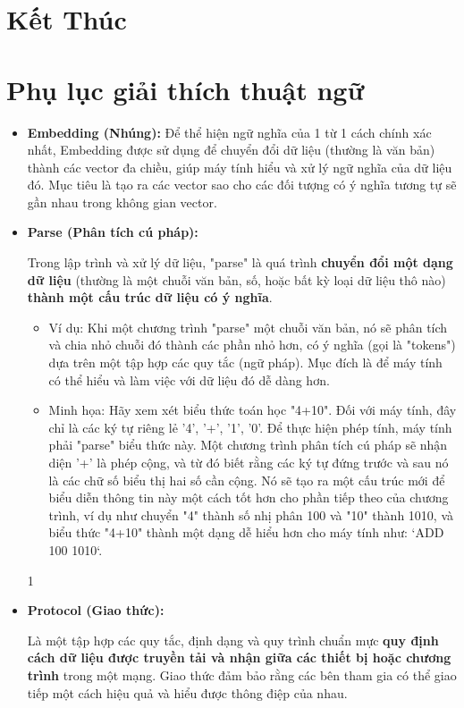 \documentclass[11pt]{article}
\begin{document}
\section{Kết Thúc}

\clearpage
\appendix
\section{Phụ lục giải thích thuật ngữ} \label{app:glossary}
\begin{itemize}
	\item \textbf{Embedding (Nhúng):} \label{app:embedding} Để thể hiện ngữ nghĩa của 1 từ 1 cách chính xác nhất, Embedding được sử dụng để chuyển đổi dữ liệu (thường là văn bản) thành các vector đa chiều, giúp máy tính hiểu và xử lý ngữ nghĩa của dữ liệu đó. Mục tiêu là tạo ra các vector sao cho các đối tượng có ý nghĩa tương tự sẽ gần nhau trong không gian vector.

    \item \textbf{Parse (Phân tích cú pháp):} \label{app:parse}
    \begin{boxC}
        Trong lập trình và xử lý dữ liệu, "parse" là quá trình \textbf{chuyển đổi một dạng dữ liệu} (thường là một chuỗi văn bản, số, hoặc bất kỳ loại dữ liệu thô nào) \textbf{thành một cấu trúc dữ liệu có ý nghĩa}.
        \begin{itemize}
            \item Ví dụ: Khi một chương trình "parse" một chuỗi văn bản, nó sẽ phân tích và chia nhỏ chuỗi đó thành các phần nhỏ hơn, có ý nghĩa (gọi là "tokens") dựa trên một tập hợp các quy tắc (ngữ pháp). Mục đích là để máy tính có thể hiểu và làm việc với dữ liệu đó dễ dàng hơn.
            \item Minh họa: Hãy xem xét biểu thức toán học "4+10". Đối với máy tính, đây chỉ là các ký tự riêng lẻ '4', '+', '1', '0'. Để thực hiện phép tính, máy tính phải "parse" biểu thức này. Một chương trình phân tích cú pháp sẽ nhận diện '+' là phép cộng, và từ đó biết rằng các ký tự đứng trước và sau nó là các chữ số biểu thị hai số cần cộng. Nó sẽ tạo ra một cấu trúc mới để biểu diễn thông tin này một cách tốt hơn cho phần tiếp theo của chương trình, ví dụ như chuyển "4" thành số nhị phân 100 và "10" thành 1010, và biểu thức "4+10" thành một dạng dễ hiểu hơn cho máy tính như: `ADD 100 1010`.
        \end{itemize}
    \end{boxC}
1
    \item \textbf{Protocol (Giao thức):} \label{app:protocol}
    \begin{boxC}
        Là một tập hợp các quy tắc, định dạng và quy trình chuẩn mực \textbf{quy định cách dữ liệu được truyền tải và nhận giữa các thiết bị hoặc chương trình} trong một mạng. Giao thức đảm bảo rằng các bên tham gia có thể giao tiếp một cách hiệu quả và hiểu được thông điệp của nhau.
    \end{boxC}


\end{itemize}
\end{document}
